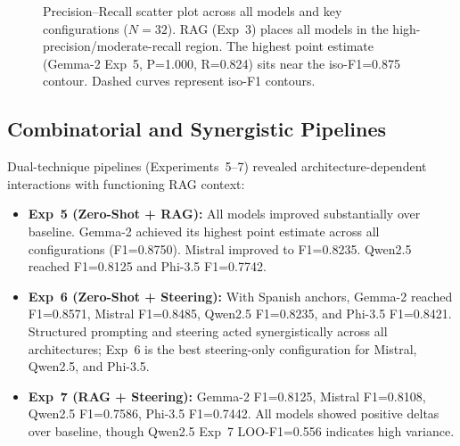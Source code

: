 \documentclass{ieeeaccess}
\begin{document}
\begin{figure}[htbp]
{
}%
\caption{Precision--Recall scatter plot across all models and key configurations ($N=32$). RAG (Exp~3) places all models in the high-precision/moderate-recall region. The highest point estimate (Gemma-2 Exp~5, P=1.000, R=0.824) sits near the iso-F1=0.875 contour. Dashed curves represent iso-F1 contours.}
\label{fig:precision_recall}
\end{figure}

\subsection{Combinatorial and Synergistic Pipelines}

Dual-technique pipelines (Experiments~5--7) revealed architecture-dependent interactions with functioning RAG context:

\begin{itemize}
    \item \textbf{Exp~5 (Zero-Shot + RAG):} All models improved substantially over baseline. Gemma-2 achieved its highest point estimate across all configurations (F1=0.8750). Mistral improved to F1=0.8235. Qwen2.5 reached F1=0.8125 and Phi-3.5 F1=0.7742.
    \item \textbf{Exp~6 (Zero-Shot + Steering):} With Spanish anchors, Gemma-2 reached F1=0.8571, Mistral F1=0.8485, Qwen2.5 F1=0.8235, and Phi-3.5 F1=0.8421. Structured prompting and steering acted synergistically across all architectures; Exp~6 is the best steering-only configuration for Mistral, Qwen2.5, and Phi-3.5.
    \item \textbf{Exp~7 (RAG + Steering):} Gemma-2 F1=0.8125, Mistral F1=0.8108, Qwen2.5 F1=0.7586, Phi-3.5 F1=0.7442. All models showed positive deltas over baseline, though Qwen2.5 Exp~7 LOO-F1=0.556 indicates high variance.
\end{itemize}
\end{document}
